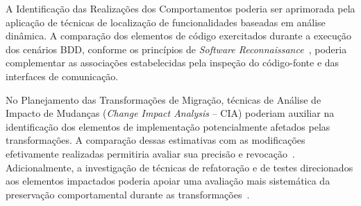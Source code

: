 A Identificação das Realizações dos Comportamentos poderia ser aprimorada pela aplicação de técnicas de localização de funcionalidades baseadas em análise dinâmica. A comparação dos elementos de código exercitados durante a execução dos cenários BDD, conforme os princípios de \textit{Software Reconnaissance}~\cite{WildeScully1995}, poderia complementar as associações estabelecidas pela inspeção do código-fonte e das interfaces de comunicação.

No Planejamento das Transformações de Migração, técnicas de Análise de Impacto de Mudanças (\textit{Change Impact Analysis} -- CIA) poderiam auxiliar na identificação dos elementos de implementação potencialmente afetados pelas transformações. A comparação dessas estimativas com as modificações efetivamente realizadas permitiria avaliar sua precisão e revocação~\cite{Li2013CIA}. Adicionalmente, a investigação de técnicas de refatoração e de testes direcionados aos elementos impactados poderia apoiar uma avaliação mais sistemática da preservação comportamental durante as transformações~\cite{Mongiovi2014,AlOmar2021}.

